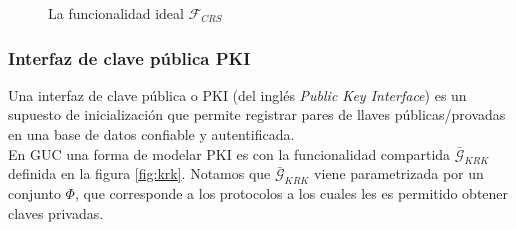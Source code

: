 \begin{figure}
\caption{La funcionalidad ideal $\mathcal{F}_{CRS}$}
\label{fig:crs}
\end{figure}


\subsubsection{Interfaz de clave pública PKI}
Una interfaz de clave pública o PKI (del inglés \textit{Public Key Interface}) es un supuesto de inicialización
que permite registrar pares de llaves públicas/provadas en una base de datos confiable y autentificada.\\
En GUC una forma de modelar PKI es con la funcionalidad compartida $\bar{\mathcal{G}}_{KRK}$ definida en la figura
\ref{fig:krk}. Notamos que $\bar{\mathcal{G}}_{KRK}$ viene parametrizada por un conjunto $\Phi$, que corresponde
a los protocolos a los cuales les es permitido obtener claves privadas. 

